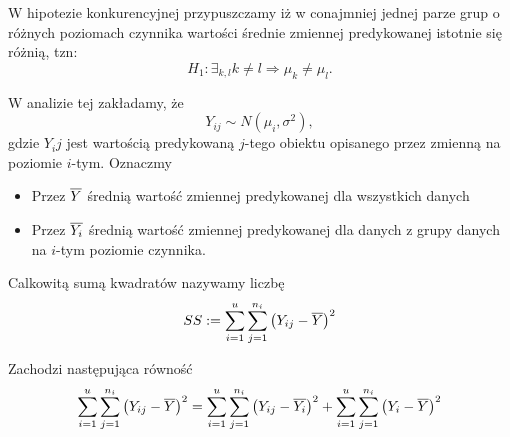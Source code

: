 \documentclass[10pt,a4paper]{book}
\begin{document}
\begin{definition}
W hipotezie konkurencyjnej przypuszczamy iż w conajmniej jednej parze grup o różnych poziomach czynnika wartości średnie zmiennej predykowanej istotnie się różnią, tzn:
\begin{equation*}
H_1 : \exists_{k,l} k \neq l \Rightarrow \mu_k \neq \mu_l.
\end{equation*}
\end{definition}

W analizie tej zakładamy, że 
$$
Y_{ij} \sim N(\mu_i, \sigma^2),
$$
gdzie $Y_ij$ jest wartością predykowaną $j$-tego obiektu opisanego przez zmienną na poziomie $i$-tym. Oznaczmy

\begin{itemize}
\item Przez $\overline{Y}$ średnią wartość zmiennej predykowanej dla wszystkich danych
\item Przez $\overline{Y_i}$ średnią wartość zmiennej predykowanej dla danych z grupy danych na $i$-tym poziomie czynnika.
\end{itemize}

\begin{definition}
Calkowitą sumą kwadratów nazywamy liczbę
$$
SS := \sum_{i=1}^{u} \sum_{j=1}^{n_i} \bracket{Y_{ij} - \mean{Y}}^2
$$
\end{definition}

\begin{lemma}
Zachodzi następująca równość
$$
\sum_{i=1}^{u} \sum_{j=1}^{n_i} \bracket{Y_{ij} - \mean{Y}}^2 = \sum_{i=1}^{u} \sum_{j=1}^{n_i} \bracket{Y_{ij} - \mean{Y_i}}^2 +
\sum_{i=1}^{u} \sum_{j=1}^{n_i} \bracket{Y_{i} - \mean{Y}}^2
$$
\end{lemma}
\end{document}
